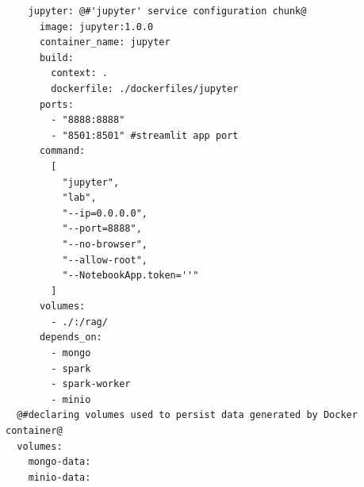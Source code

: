 \documentclass[10pt]{article}
\begin{document}
\begin{lstlisting}
    jupyter: @#'jupyter' service configuration chunk@
      image: jupyter:1.0.0
      container_name: jupyter
      build:
        context: .
        dockerfile: ./dockerfiles/jupyter
      ports:
        - "8888:8888"
        - "8501:8501" #streamlit app port
      command:
        [
          "jupyter",
          "lab",
          "--ip=0.0.0.0",
          "--port=8888",
          "--no-browser",
          "--allow-root",
          "--NotebookApp.token=''"
        ]
      volumes:
        - ./:/rag/
      depends_on:
        - mongo
        - spark
        - spark-worker
        - minio
  @#declaring volumes used to persist data generated by Docker container@
  volumes:
    mongo-data:
    minio-data:
  
\end{lstlisting}
\end{document}
